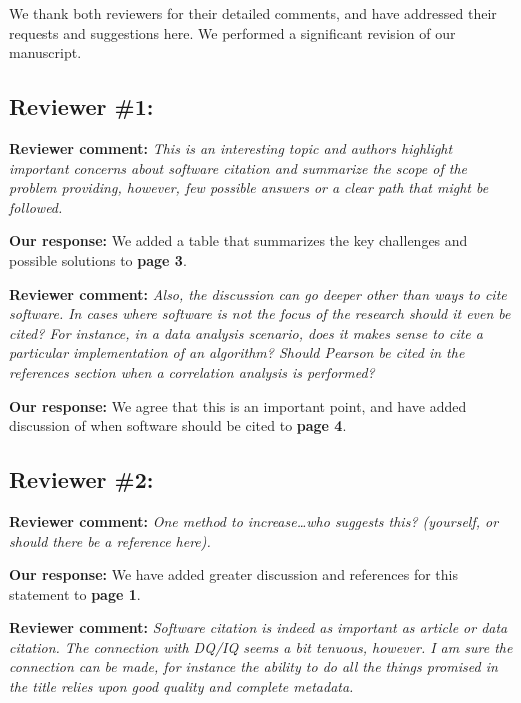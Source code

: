 \documentclass{article}
\providecommand{\hly}[1]{\colorbox{yellow}{#1}}
\providecommand{\hlr}[1]{\colorbox{SkyBlue}{#1}}
\begin{document}
We thank both reviewers for their detailed comments, and have addressed their requests and suggestions here.
We performed a significant revision of our manuscript.


\subsection*{Reviewer \#1:}

\textbf{Reviewer comment:}
\emph{This is an interesting topic and authors highlight important concerns about software citation and summarize the scope of the problem providing, however, few possible answers or a clear path that might be followed.}

\textbf{Our response:}
We added a table that summarizes the key challenges and possible solutions to \textbf{page 3}.


\textbf{Reviewer comment:}
\emph{Also, the discussion can go deeper other than ways to cite software. In cases where software is not the focus of the research should it even be cited? For instance, in a data analysis scenario, does it makes sense to cite a particular implementation of an algorithm? Should Pearson be cited in the references section when a correlation analysis is performed?}

\textbf{Our response:}
We agree that this is an important point, and have added discussion of when software should be cited to \textbf{page 4}.

\subsection*{Reviewer \#2:}

\textbf{Reviewer comment:}
\emph{One method to increase\ldots who suggests this? (yourself, or should there be a reference here).}

\textbf{Our response:}
We have added greater discussion and references for this statement to \textbf{page 1}.

\textbf{Reviewer comment:}
\emph{Software citation is indeed as important as article or data citation. The connection with DQ\slash IQ seems a bit tenuous, however. I am sure the connection can be made, for instance the ability to do all the things promised in the title relies upon good quality and complete metadata.}
\end{document}
